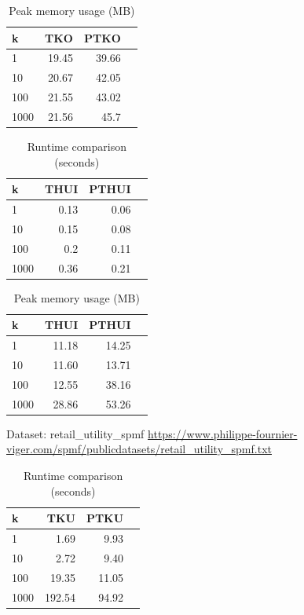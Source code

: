 \begin{table}[H]
\caption{Peak memory usage (MB)}\label{tab:memory}
\centering
\begin{tabular}{@{}lrrr@{}}
\toprule
\textbf{k} & \textbf{TKO} & \textbf{PTKO} \\
\midrule
1 & 19.45 & 39.66 \\
10 & 20.67 & 42.05 \\
100 & 21.55 & 43.02 \\
1000 & 21.56 & 45.7 \\

\bottomrule
\end{tabular}
\end{table}

\begin{table}[H]
\caption{Runtime comparison (seconds)}\label{tab:runtime}
\centering
\begin{tabular}{@{}lrrr@{}}
\toprule
\textbf{k} & \textbf{THUI} & \textbf{PTHUI}\\
\midrule
1 & 0.13 & 0.06 \\
10 & 0.15 & 0.08 \\
100 & 0.2 & 0.11 \\
1000 & 0.36 & 0.21 \\
\bottomrule
\end{tabular}
\end{table}

\begin{table}[H]
\caption{Peak memory usage (MB)}\label{tab:memory}
\centering
\begin{tabular}{@{}lrrr@{}}
\toprule
\textbf{k} & \textbf{THUI} & \textbf{PTHUI} \\
\midrule
1  & 11.18 & 14.25 \\
10 & 11.60 & 13.71 \\
100 & 12.55 & 38.16 \\
1000 & 28.86 & 53.26 \\
\bottomrule
\end{tabular}
\end{table}


Dataset: retail\_utility\_spmf
\url{https://www.philippe-fournier-viger.com/spmf/publicdatasets/retail_utility_spmf.txt}

\begin{table}[H]
\caption{Runtime comparison (seconds)}\label{tab:runtime}
\centering
\begin{tabular}{@{}lrrr@{}}
\toprule
\textbf{k} & \textbf{TKU} & \textbf{PTKU} \\
\midrule
1 & 1.69 & 9.93  \\
10 & 2.72 & 9.40  \\
100 & 19.35 & 11.05 \\
1000 & 192.54 & 94.92 \\
\bottomrule
\end{tabular}
\end{table}

